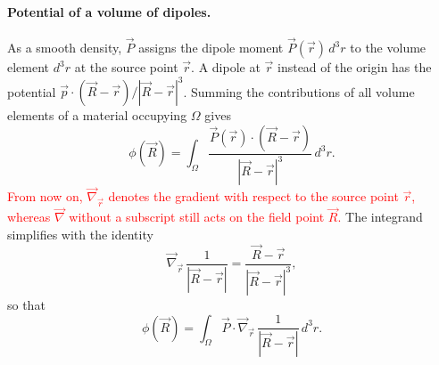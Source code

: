 \paragraph{Potential of a volume of dipoles.}
As a smooth density, $\vec P$ assigns the dipole moment $\vec P(\vec r)\,d^3r$ to the volume element $d^3r$ at the source point $\vec r$. A dipole at $\vec r$ instead of the origin has the potential $\vec p\cdot(\vec R - \vec r)/|\vec R - \vec r|^3$. Summing the contributions of all volume elements of a material occupying $\Omega$ gives
\begin{equation*}
    \phi(\vec R) = \int_\Omega \frac{\vec P(\vec r)\cdot(\vec R - \vec r)}{|\vec R - \vec r|^3}\,d^3r.
\end{equation*}
\textcolor{red}{From now on, $\vec\nabla_{\vec r}$ denotes the gradient with respect to the source point $\vec r$, whereas $\vec\nabla$ without a subscript still acts on the field point $\vec R$.} The integrand simplifies with the identity
\begin{equation*}
    \vec\nabla_{\vec r}\,\frac{1}{|\vec R - \vec r|} = \frac{\vec R - \vec r}{|\vec R - \vec r|^3},
\end{equation*}
so that
\begin{equation*}
    \phi(\vec R) = \int_\Omega \vec P\cdot\vec\nabla_{\vec r}\,\frac{1}{|\vec R - \vec r|}\,d^3r.
\end{equation*}

